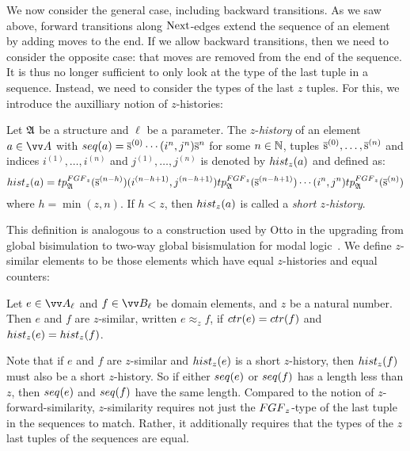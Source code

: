 We now consider the general case, including backward transitions.
As we saw above, forward transitions along $\mathrm{Next}$-edges extend the sequence of an element by adding moves to the end.
If we allow backward transitions, then we need to consider the opposite case: that moves are removed from the end of the sequence.
It is thus no longer sufficient to only look at the type of the last tuple in a sequence.
Instead, we need to consider the types of the last $z$ tuples.
For this, we introduce the auxilliary notion of $z$-histories:
\begin{definition}[$z$-history]
  Let ${\mathfrak{A}}$ be a structure and $\ell$ be a parameter.
  The $z$-\emph{history} of an element $a \in \unraveldom{A}$ with $\seq{a} = \elemtuples^{(0)} \cdots (i^{n}, j^{n})\elemtuples^{n}$ for some $n \in {\mathbb{N}}$, tuples $\overline{\mathrm{s}}^{(0)}, \ldots, \overline{\mathrm{s}}^{(n)}$ and indices $i^{(1)}, \ldots, i^{(n)}$ and $j^{(1)}, \ldots, j^{(n)}$ is denoted by $\hist{z}{a}$ and defined as:
  \begin{equation*}
    \hist{z}{a} = \tp{\FGF_{z}}{\str{A}}{\elemtuples^{(n-h)}}(i^{(n-h+1)}, j^{(n-h+1)})\tp{\FGF_{z}}{\str{A}}{\elemtuples^{(n-h+1)}}\cdots(i^{n}, j^{n})\tp{\FGF_{z}}{\str{A}}{\elemtuples^{(n)}}
  \end{equation*}
  where $h = \min(z, n)$. If $h < z$, then $\hist{z}{a}$ is called a \emph{short $z$-history}.
\end{definition}
This definition is analogous to a construction used by Otto in the upgrading from global bisimulation to two-way global bisismulation for modal logic~\cite[Def. 39]{Otto04}.
We define $z$-similar elements to be those elements which have equal $z$-histories and equal counters:
\begin{definition}
 Let $e \in \unraveldom{A}_{\ell}$ and $f \in \unraveldom{B}_{\ell}$ be domain elements, and $z$ be a natural number. Then $e$ and $f$ are $z$-similar, written $e \approx_{z} f$, if $\ctr{e} = \ctr{f}$ and $\hist{z}{e} = \hist{z}{f}$.
\end{definition}
Note that if $e$ and $f$ are $z$-similar and $\hist{z}{e}$ is a short $z$-history, then $\hist{z}{f}$ must also be a short $z$-history.
So if either $\seq{e}$ or $\seq{f}$ has a length less than $z$, then $\seq{e}$ and $\seq{f}$ have the same length.
Compared to the notion of $z$-forward-similarity, $z$-similarity requires not just the $\FGF_{z}$-type of the last tuple in the sequences to match.
Rather, it additionally requires that the types of the $z$ last tuples of the sequences are equal.
